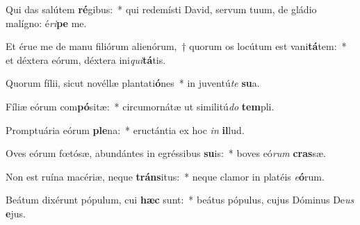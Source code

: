 \item Qui das salútem \textbf{ré}gibus:~* qui redemísti David, servum tuum, de gládio malígno: é\textit{ri}\textbf{pe} me.
\item Et érue me de manu filiórum alienórum,~† quorum os locútum est vani\textbf{tá}tem:~* et déxtera eórum, déxtera ini\textit{qui}\textbf{tá}tis.
\item Quorum fílii, sicut novéllæ plantati\textbf{ó}nes~* in juventú\textit{te} \textbf{su}a.
\item Fíliæ eórum com\textbf{pó}sitæ:~* circumornátæ ut similitú\textit{do} \textbf{tem}pli.
\item Promptuária eórum \textbf{ple}na:~* eructántia ex hoc \textit{in} \textbf{il}lud.
\item Oves eórum fœtósæ, abundántes in egréssibus \textbf{su}is:~* boves eó\textit{rum} \textbf{cras}sæ.
\item Non est ruína macériæ, neque \textbf{tráns}itus:~* neque clamor in platéis \textit{e}\textbf{ó}rum.
\item Beátum dixérunt pópulum, cui \textbf{hæc} sunt:~* beátus pópulus, cujus Dóminus De\textit{us} \textbf{e}jus.
